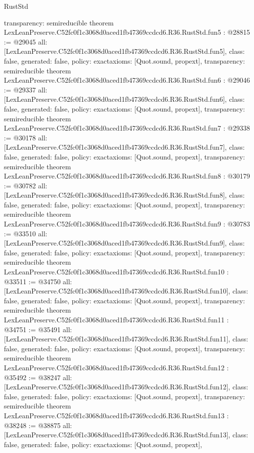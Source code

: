 \begin{lexlean}{RustStd}
\begin{coremodule}
{  transparency: semireducible
}
theorem LexLeanPreserve.C52fc0f1c3068d0aced1fb47369ccdcd6.R36.RustStd.fun5 : @28815 := @29045 {
  all: [LexLeanPreserve.C52fc0f1c3068d0aced1fb47369ccdcd6.R36.RustStd.fun5],
  class: false,
  generated: false,
  policy: exact{axioms: [Quot.sound, propext]},
  transparency: semireducible
}
theorem LexLeanPreserve.C52fc0f1c3068d0aced1fb47369ccdcd6.R36.RustStd.fun6 : @29046 := @29337 {
  all: [LexLeanPreserve.C52fc0f1c3068d0aced1fb47369ccdcd6.R36.RustStd.fun6],
  class: false,
  generated: false,
  policy: exact{axioms: [Quot.sound, propext]},
  transparency: semireducible
}
theorem LexLeanPreserve.C52fc0f1c3068d0aced1fb47369ccdcd6.R36.RustStd.fun7 : @29338 := @30178 {
  all: [LexLeanPreserve.C52fc0f1c3068d0aced1fb47369ccdcd6.R36.RustStd.fun7],
  class: false,
  generated: false,
  policy: exact{axioms: [Quot.sound, propext]},
  transparency: semireducible
}
theorem LexLeanPreserve.C52fc0f1c3068d0aced1fb47369ccdcd6.R36.RustStd.fun8 : @30179 := @30782 {
  all: [LexLeanPreserve.C52fc0f1c3068d0aced1fb47369ccdcd6.R36.RustStd.fun8],
  class: false,
  generated: false,
  policy: exact{axioms: [Quot.sound, propext]},
  transparency: semireducible
}
theorem LexLeanPreserve.C52fc0f1c3068d0aced1fb47369ccdcd6.R36.RustStd.fun9 : @30783 := @33510 {
  all: [LexLeanPreserve.C52fc0f1c3068d0aced1fb47369ccdcd6.R36.RustStd.fun9],
  class: false,
  generated: false,
  policy: exact{axioms: [Quot.sound, propext]},
  transparency: semireducible
}
theorem LexLeanPreserve.C52fc0f1c3068d0aced1fb47369ccdcd6.R36.RustStd.fun10 : @33511 := @34750 {
  all: [LexLeanPreserve.C52fc0f1c3068d0aced1fb47369ccdcd6.R36.RustStd.fun10],
  class: false,
  generated: false,
  policy: exact{axioms: [Quot.sound, propext]},
  transparency: semireducible
}
theorem LexLeanPreserve.C52fc0f1c3068d0aced1fb47369ccdcd6.R36.RustStd.fun11 : @34751 := @35491 {
  all: [LexLeanPreserve.C52fc0f1c3068d0aced1fb47369ccdcd6.R36.RustStd.fun11],
  class: false,
  generated: false,
  policy: exact{axioms: [Quot.sound, propext]},
  transparency: semireducible
}
theorem LexLeanPreserve.C52fc0f1c3068d0aced1fb47369ccdcd6.R36.RustStd.fun12 : @35492 := @38247 {
  all: [LexLeanPreserve.C52fc0f1c3068d0aced1fb47369ccdcd6.R36.RustStd.fun12],
  class: false,
  generated: false,
  policy: exact{axioms: [Quot.sound, propext]},
  transparency: semireducible
}
theorem LexLeanPreserve.C52fc0f1c3068d0aced1fb47369ccdcd6.R36.RustStd.fun13 : @38248 := @38875 {
  all: [LexLeanPreserve.C52fc0f1c3068d0aced1fb47369ccdcd6.R36.RustStd.fun13],
  class: false,
  generated: false,
  policy: exact{axioms: [Quot.sound, propext]},
}
\end{coremodule}
\end{lexlean}

